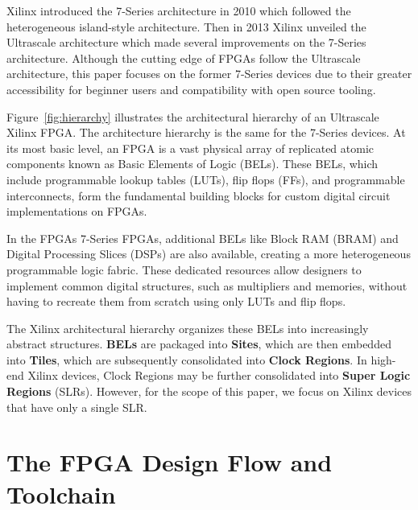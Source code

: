 \documentclass[twocolumn]{article}
\begin{document}
    Xilinx introduced the 7-Series architecture in 2010 which followed the heterogeneous island-style architecture. 
    Then in 2013 Xilinx unveiled the Ultrascale architecture which made several improvements on the 7-Series architecture.
    Although the cutting edge of FPGAs follow the Ultrascale architecture, this paper focuses on the former 7-Series devices due to their greater accessibility for beginner users and compatibility with open source tooling.

    Figure~\ref{fig:hierarchy} illustrates the architectural hierarchy of an Ultrascale Xilinx FPGA. 
    The architecture hierarchy is the same for the 7-Series devices. 
    At its most basic level, an FPGA is a vast physical array of replicated atomic components known as Basic Elements of Logic (BELs). 
    These BELs, which include programmable lookup tables (LUTs), flip flops (FFs), and programmable interconnects, form the fundamental building blocks for custom digital circuit implementations on FPGAs. 

    In the FPGAs 7-Series FPGAs, additional BELs like Block RAM (BRAM) and Digital Processing Slices (DSPs) are also available, creating a more heterogeneous programmable logic fabric. 
    These dedicated resources allow designers to implement common digital structures, such as multipliers and memories, without having to recreate them from scratch using only LUTs and flip flops. 

    The Xilinx architectural hierarchy organizes these BELs into increasingly abstract structures. 
    \textbf{BELs} are packaged into \textbf{Sites}, which are then embedded into \textbf{Tiles}, which are subsequently consolidated into \textbf{Clock Regions}. 
    In high-end Xilinx devices, Clock Regions may be further consolidated into \textbf{Super Logic Regions} (SLRs). 
    However, for the scope of this paper, we focus on Xilinx devices that have only a single SLR. 

\section{The FPGA Design Flow and Toolchain}
    
\end{document}
